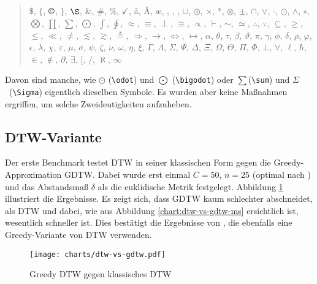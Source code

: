\begin{quote}
$\$$,
$\{$,
$\copyright$,
$\}$,
$\S$,
$\&$,
$\#$,
$\%$,
$\checkmark$,
\aa,
\AA,
\ae,
\DH,
\DJ,
\EUR,
$\cup$,
$\oplus$,
$\times$,
$\ast$,
$\otimes$,
$\pm$,
$\cap$,
$\vee$,
$\cdot$,
$\odot$,
$\wedge$,
$\circ$,
$\bigotimes$,
$\prod$,
$\sum$,
$\bigodot$,
$\int$,
$\oint$,
$\approx$,
$\equiv$,
$\perp$,
$\cong$,
$\propto$,
$\vdash$,
$\sim$,
$\simeq$,
$\therefore$,
$\because$,
$\subseteq$,
$\geq$,
$\leq$,
$\ll$,
$\neq$,
$\lesssim$,
$\gtrsim$,
$\triangleq$,
$\Rightarrow$,
$\rightarrow$,
$\Leftrightarrow$,
$\mapsto$,
$\alpha$,
$\theta$,
$\tau$,
$\beta$,
$\vartheta$,
$\pi$,
$\gamma$,
$\phi$,
$\delta$,
$\rho$,
$\varphi$,
$\epsilon$,
$\lambda$,
$\chi$,
$\varepsilon$,
$\mu$,
$\sigma$,
$\psi$,
$\zeta$,
$\nu$,
$\omega$,
$\eta$,
$\xi$,
$\Gamma$,
$\Lambda$,
$\Sigma$,
$\Psi$,
$\Delta$,
$\Xi$,
$\Omega$,
$\Theta$,
$\Pi$,
$\Phi$,
$\bot$,
$\forall$,
$\ell$,
$\hbar$,
$\in$,
$\not\in$,
$\partial$,
$\exists$,
$[$,
$/$,
$\aleph$,
$\infty$
\end{quote}

Davon sind manche, wie $\odot$ (\verb!\odot!) und $\bigodot$ (\verb!\bigodot!) oder $\sum$(\verb!\sum!) und $\Sigma$~(\verb!\Sigma!) eigentlich dieselben Symbole. Es wurden aber keine Maßnahmen ergriffen, um solche Zweideutigkeiten aufzuheben.

\subsection{DTW-Variante}
\label{sub:variant}

Der erste Benchmark testet DTW in seiner klassischen Form gegen die Greedy-Approximation GDTW. Dabei wurde erst einmal $C=50$, $n=25$ (optimal nach \citet{Golubitsky:2009p1842}) und das Abstandsmaß $\delta$ als die euklidische Metrik festgelegt. Abbildung \ref{chart:dtw-vs-gdtw} illustriert die Ergebnisse. Es zeigt sich, dass GDTW kaum schlechter abschneidet, als DTW und dabei, wie aus Abbildung \ref{chart:dtw-vs-gdtw-ms} ersichtlich ist, wesentlich schneller ist. Dies bestätigt die Ergebnisse von \citet{MacLean:2010p9970}, die ebenfalls eine Greedy-Variante von DTW verwenden.

\begin{figure}[htbp]
  \begin{center}
    \texttt{[image: charts/dtw-vs-gdtw.pdf]}
  \end{center}
  \caption{Greedy DTW gegen klassisches DTW}
  \label{chart:dtw-vs-gdtw}
\end{figure}

